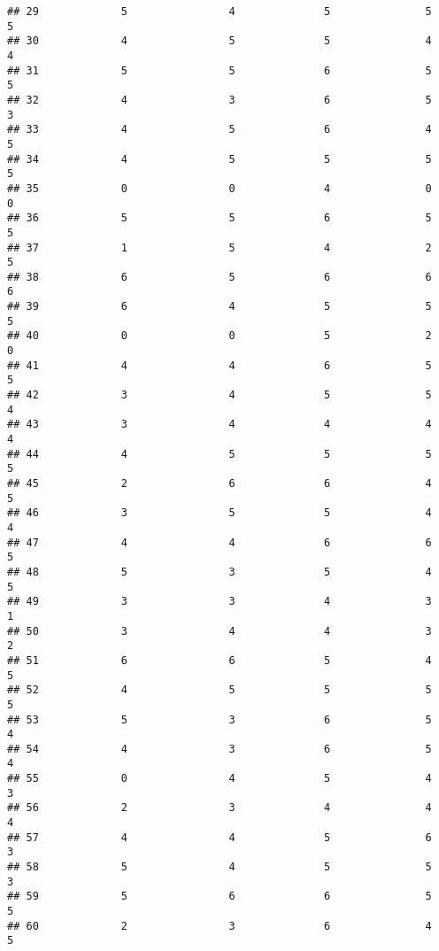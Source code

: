\documentclass[
]{article}
\begin{document}
\begin{verbatim}
## 29             5                4              5               5              5
## 30             4                5              5               4              4
## 31             5                5              6               5              5
## 32             4                3              6               5              3
## 33             4                5              6               4              5
## 34             4                5              5               5              5
## 35             0                0              4               0              0
## 36             5                5              6               5              5
## 37             1                5              4               2              5
## 38             6                5              6               6              6
## 39             6                4              5               5              5
## 40             0                0              5               2              0
## 41             4                4              6               5              5
## 42             3                4              5               5              4
## 43             3                4              4               4              4
## 44             4                5              5               5              5
## 45             2                6              6               4              5
## 46             3                5              5               4              4
## 47             4                4              6               6              5
## 48             5                3              5               4              5
## 49             3                3              4               3              1
## 50             3                4              4               3              2
## 51             6                6              5               4              5
## 52             4                5              5               5              5
## 53             5                3              6               5              4
## 54             4                3              6               5              4
## 55             0                4              5               4              3
## 56             2                3              4               4              4
## 57             4                4              5               6              3
## 58             5                4              5               5              3
## 59             5                6              6               5              5
## 60             2                3              6               4              5

\end{verbatim}
\end{document}
